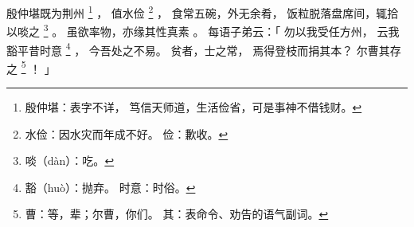 
\switchcolumn*[\section{}]

殷仲堪既为荆州%
\footnote{%
    殷仲堪：表字不详，
            笃信天师道，生活俭省，可是事神不借钱财。
}%
，
值水俭%
\footnote{%
    水俭：因水灾而年成不好。
    俭：歉收。
}%
，
食常五碗，外无余肴，
饭粒脱落盘席间，辄拾以啖之%
\footnote{%
    啖（dàn）：吃。
}%
。
虽欲率物，亦缘其性真素
。
每语子弟云：「
    勿以我受任方州，
    云我豁平昔时意%
    \footnote{%
        豁（huò）：抛弃。
        时意：时俗。
    }%
    ，
    今吾处之不易。
    贫者，士之常，
    焉得登枝而捐其本？
    尔曹其存之%
    \footnote{%
        曹：等，辈；尔曹，你们。
        其：表命令、劝告的语气副词。
    }%
    ！
」

\switchcolumn



